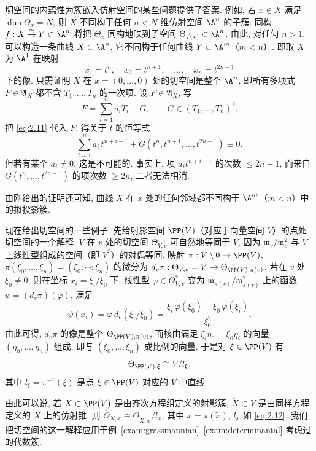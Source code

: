 切空间的内蕴性为簇嵌入仿射空间的某些问题提供了答案. 例如, 若 $x \in X$ 满足 $\dim \Theta_x = N$, 则 $X$ 不同构于任何 $n < N$ 维仿射空间 $\A^n$ 的子簇: 同构 $f: X \overset{\sim}{\to} Y \subset \A^n$ 将把 $\Theta_x$ 同构地映到子空间 $\Theta_{f(x)} \subset \A^n$. 由此, 对任何 $n > 1$, 可以构造一条曲线 $X \subset \A^n$, 它不同构于任何曲线 $Y \subset \A^m$（$m < n$）. 即取 $X$ 为 $\A^1$ 在映射
\begin{equation}
	\label{eq:2.11}
	x_1 = t^n, \quad x_2 = t^{n+1}, \quad \ldots, \quad x_n = t^{2n-1}
\end{equation}
下的像. 只需证明 $X$ 在 $x = (0, \ldots, 0)$ 处的切空间是整个 $\A^n$, 即所有多项式 $F \in \mathfrak A_X$ 都不含 $T_1, \ldots, T_n$ 的一次项. 设 $F \in \mathfrak A_X$, 写
\[
	F = \sum_{i=1}^{n} a_i T_i + G, \qquad G \in (T_1, \ldots, T_n)^2.
\]
把 \eqref{eq:2.11} 代入 $F$, 得关于 $t$ 的恒等式
\[
	\sum_{i=1}^{n} a_i\, t^{n+i-1} + G(t^n, t^{n+1}, \ldots, t^{2n-1}) \equiv 0.
\]
但若有某个 $a_i \ne 0$, 这是不可能的. 事实上, 项 $a_i t^{n+i-1}$ 的次数 $\le 2n-1$, 而来自 $G(t^n, \ldots, t^{2n-1})$ 的项次数 $\ge 2n$, 二者无法相消.

由刚给出的证明还可知, 曲线 $X$ 在 $x$ 处的任何邻域都不同构于 $\A^m$（$m < n$）中的拟投影簇.

现在给出切空间的一些例子. 先给射影空间 $\PP(V)$（对应于向量空间 $V$）的点处切空间的一个解释. $V$ 在 $v$ 处的切空间 $\Theta_{V,v}$ 可自然地等同于 $V$, 因为 $\mathfrak m_v/\mathfrak m_v^2$ 与 $V$ 上线性型组成的空间（即 $V^*$）的对偶等同. 映射 $\pi: V \setminus 0 \to \PP(V)$, $\pi(\xi_0, \ldots, \xi_n) = (\xi_0 : \cdots : \xi_n)$ 的微分为 $d_v \pi: \Theta_{V,v} = V \to \Theta_{\PP(V),\pi(v)}$. 若在 $v$ 处 $\xi_0 \ne 0$, 则在坐标 $x_i = \xi_i/\xi_0$ 下, 线性型 $\varphi \in \Theta_{V,v}^*$ 变为 $\mathfrak m_{\pi(v)}/\mathfrak m_{\pi(v)}^2$ 上的函数 $\psi = (d_v \pi)(\varphi)$, 满足
\[
	\psi(x_i) = \varphi\, d_v(\xi_i/\xi_0) = \frac{\xi_i\, \varphi(\xi_0) - \xi_0\, \varphi(\xi_i)}{\xi_0^2}.
\]
由此可得, $d_v\pi$ 的像是整个 $\Theta_{\PP(V),\pi(v)}$, 而核由满足 $\xi_i \eta_0 = \xi_0 \eta_i$ 的向量 $(\eta_0, \ldots, \eta_n)$ 组成, 即与 $(\xi_0, \ldots, \xi_n)$ 成比例的向量. 于是对 $\xi \in \PP(V)$ 有
\begin{equation}
	\label{eq:2.12}
	\Theta_{\PP(V),\xi} \cong V / l_\xi,
\end{equation}
其中 $l_\xi = \pi^{-1}(\xi)$ 是点 $\xi \in \PP(V)$ 对应的 $V$ 中直线.

由此可以说, 若 $X \subset \PP(V)$ 是由齐次方程组定义的射影簇, $\widetilde X \subset V$ 是由同样方程定义的 $X$ 上的仿射锥, 则 $\overline\Theta_{X,x} \cong \Theta_{\widetilde X,\widetilde x} / l_x$, 其中 $x = \pi(\widetilde x)$, $l_x$ 如 \eqref{eq:2.12}. 我们把切空间的这一解释应用于例~\ref{exam:grassmannian}--\ref{exam:determinantal} 考虑过的代数簇.

